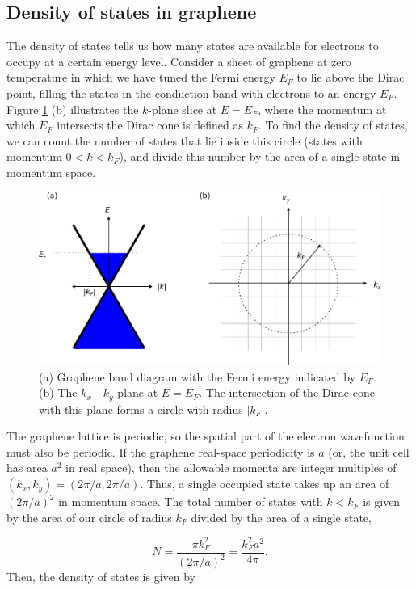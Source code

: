 \documentclass{beavtex_dub_edit}
\begin{document}
\subsection{Density of states in graphene}
The density of states tells us how many states are available for electrons to occupy at a certain energy level. Consider a sheet of graphene at zero temperature in which we have tuned the Fermi energy $E_F$ to lie above the Dirac point, filling the states in the conduction band with electrons to an energy $E_F$. Figure \ref{density of states graphic} (b) illustrates the $k$-plane slice at $E = E_F$, where the momentum at which $E_F$ intersects the Dirac cone is defined as $k_F$. To find the density of states, we can count the number of states that lie inside this circle (states with momentum $0 < k < k_F$), and divide this number by the area of a single state in momentum space.

\begin{figure}
    \includegraphics[width = 1\textwidth]{density of states graphic.pdf}
    \caption{(a) Graphene band diagram with the Fermi energy indicated by $E_F$. (b) The $k_x$ - $k_y$ plane at $E = E_F$. The intersection of the Dirac cone with this plane forms a circle with radius $|k_F|$.}
    \label{density of states graphic}
\end{figure}
The graphene lattice is periodic, so the spatial part of the electron wavefunction must also be periodic. If the graphene real-space periodicity is $a$ (or, the unit cell has area $a^2$ in real space), then the allowable momenta are integer multiples of $(k_x, k_y) = (2\pi/a, 2\pi/a)$. Thus, a single occupied state takes up an area of $(2\pi/a)^2$ in momentum space. The total number of states with $k < k_F$ is given by the area of our circle of radius $k_F$ divided by the area of a single state,

\begin{equation}
    N = \frac{\pi k_F^2}{(2\pi/a)^2} = \frac{k_F^2 a^2}{4\pi}. 
\end{equation}
Then, the density of states is given by 
\end{document}
